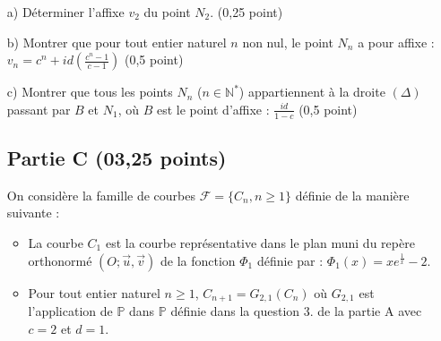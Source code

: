 \documentclass[11pt]{article}
\begin{document}
\begin{enumerate}
    \begin{enumerate}
        \item[a)] Déterminer l'affixe \( v_2 \) du point \( N_2 \). \hfill (0,25 point)

        \item[b)] Montrer que pour tout entier naturel \( n \) non nul, le point \( N_n \) a pour affixe :
        \(
        v_n = c^n + id \left( \frac{c^n - 1}{c - 1} \right)
        \)
        \hfill (0,5 point)

        \item[c)] Montrer que tous les points \( N_n \) (\( n \in \mathbb{N}^* \)) appartiennent à la droite \( (\Delta) \) passant par \( B \) et \( N_1 \), où \( B \) est le point d'affixe :
        \(
        \frac{id}{1 - c}
        \)
        \hfill (0,5 point)
        \subsection*{Partie C (03,25 points)}

On considère la famille de courbes \( \mathcal{F} = \{ C_n, n \geq 1 \} \) définie de la manière suivante :

\begin{itemize}
    \item La courbe \( C_1 \) est la courbe représentative dans le plan muni du repère orthonormé \( (O ; \vec{u}, \vec{v}) \) de la fonction \( \Phi_1 \) définie par : \( \Phi_1(x) = x e^{\frac{1}{x}} - 2 \).

    \item Pour tout entier naturel \( n \geq 1 \), \( C_{n+1} = G_{2,1}(C_n) \) où \( G_{2,1} \) est l’application de \( \mathbb{P} \) dans \( \mathbb{P} \) définie dans la question 3. de la partie A avec \( c = 2 \) et \( d = 1 \).
\end{itemize}
    \end{enumerate}
\end{enumerate}
\end{document}
